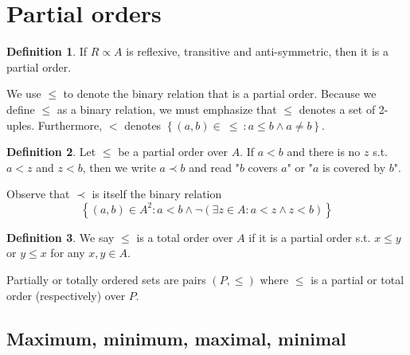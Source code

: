 \documentclass[a4paper, 12pt]{article}
\theoremstyle{definition}
\theoremstyle{definition}
\theoremstyle{definition}
\newtheorem{definition}{Definition}
\begin{document}
\pagebreak
{}
\section{Partial orders}

\begin{definition}
    If $R \propto A$ is reflexive, transitive and anti-symmetric, then it is a
    partial order.
\end{definition}

We use $\leq$ to denote the binary relation that is a partial order. Because we
define $\leq$ as a binary relation, we must emphasize that $\leq$ denotes a set
of 2-uples. Furthermore, $<$ denotes $\left\{ (a, b) \in ~ \leq ~ : a \leq b \land a
\neq b\right\} $. 

\begin{definition}
    Let $\leq$ be a partial order over $A$. If $a < b$ and there is no $z$ s.t.
    $a < z$ and $z < b$, then we write $a \prec b$ and read "$b$ covers $a$" or
    "$a$ is covered by $b$".
\end{definition}

Observe that $\prec$ is itself the binary relation 
$$\left\{ (a, b) \in A^2 : a <
b \land \neg \left( \exists z \in A : a < z \land z < b \right) \right\} $$

\begin{definition}
    We say $\leq$ is a total order over $A$ if it is a partial order s.t. $x
    \leq y$ or $y \leq x$ for any $x, y \in A$.
\end{definition}

Partially or totally ordered sets are pairs $(P, \leq)$ where $\leq$ is a
partial or total order (respectively) over $P$.

\subsection{Maximum, minimum, maximal, minimal}
\end{document}
